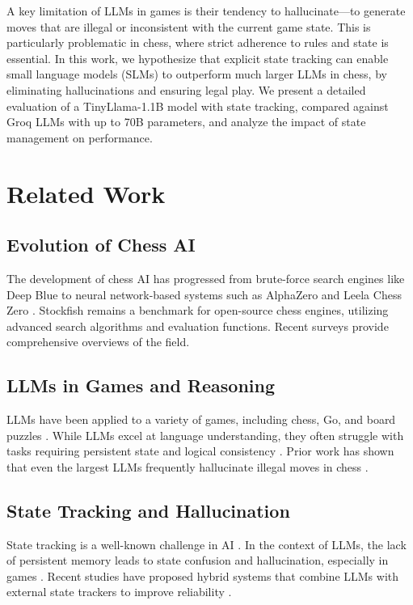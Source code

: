 \documentclass[conference]{IEEEtran}
\begin{document}
A key limitation of LLMs in games is their tendency to hallucinate---to generate moves that are illegal or inconsistent with the current game state. This is particularly problematic in chess, where strict adherence to rules and state is essential. In this work, we hypothesize that explicit state tracking can enable small language models (SLMs) to outperform much larger LLMs in chess, by eliminating hallucinations and ensuring legal play. We present a detailed evaluation of a TinyLlama-1.1B model with state tracking, compared against Groq LLMs with up to 70B parameters, and analyze the impact of state management on performance.

\section{Related Work}
\subsection{Evolution of Chess AI}
The development of chess AI has progressed from brute-force search engines like Deep Blue \cite{chess_ai_survey} to neural network-based systems such as AlphaZero \cite{alphazero} and Leela Chess Zero \cite{leela_chess_zero}. Stockfish \cite{stockfish, chess_engine_evaluation} remains a benchmark for open-source chess engines, utilizing advanced search algorithms and evaluation functions. Recent surveys \cite{chess_ai_modern, chess_ai_benchmarks} provide comprehensive overviews of the field.

\subsection{LLMs in Games and Reasoning}
LLMs have been applied to a variety of games, including chess, Go, and board puzzles \cite{llm_state_tracking, llm_chess_hybrid_systems, llm_chess_analysis, llm_chess_benchmark, llm_chess_competition}. While LLMs excel at language understanding, they often struggle with tasks requiring persistent state and logical consistency \cite{llm_chess_hallucination_study_1, llm_chess_hallucination_study_2, llm_chess_hallucination_study_3, llm_chess_hallucination_study_4, llm_limitations, llm_evaluation}. Prior work has shown that even the largest LLMs frequently hallucinate illegal moves in chess \cite{llm_chess_hallucination_study_3, llm_chess_hallucination_study_4, llm_chess_analysis_2}.

\subsection{State Tracking and Hallucination}
State tracking is a well-known challenge in AI \cite{state_tracking_ai, state_tracking_methods}. In the context of LLMs, the lack of persistent memory leads to state confusion and hallucination, especially in games \cite{llm_chess_hallucination_study_4}. Recent studies have proposed hybrid systems that combine LLMs with external state trackers to improve reliability \cite{llm_state_tracking, llm_chess_hybrid_systems}.
\end{document}
